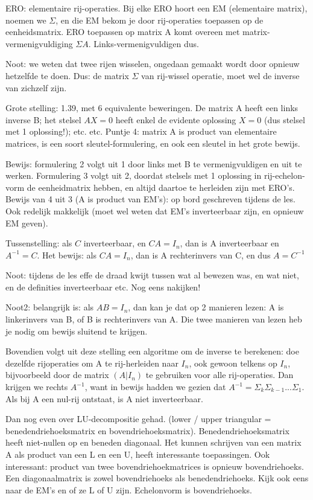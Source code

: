 \documentclass{article}
\begin{document}
ERO: elementaire rij-operaties. Bij elke ERO hoort een EM (elementaire matrix), noemen we $\Sigma$, en die EM bekom je door rij-operaties toepassen op de eenheidsmatrix. ERO toepassen op matrix A komt overeen met matrix-vermenigvuldiging $\Sigma A$. Links-vermenigvuldigen dus. 

Noot: we weten dat twee rijen wisselen, ongedaan gemaakt wordt door opnieuw hetzelfde te doen. Dus: de matrix $\Sigma$ van rij-wissel operatie, moet wel de inverse van zichzelf zijn. 

Grote stelling: 1.39, met 6 equivalente beweringen. De matrix A heeft een links inverse B; het stelsel $AX=0$ heeft enkel de evidente oplossing $X=0$ (dus stelsel met 1 oplossing!); etc. etc. Puntje 4: matrix A is product van elementaire matrices, is een soort sleutel-formulering, en ook een sleutel in het grote bewijs. 

Bewijs: formulering 2 volgt uit 1 door links met B te vermenigvuldigen en uit te werken. Formulering 3 volgt uit 2, doordat stelsels met 1 oplossing in rij-echelon-vorm de eenheidmatrix hebben, en altijd daartoe te herleiden zijn met ERO's. Bewijs van 4 uit 3 (A is product van EM's): op bord geschreven tijdens de les. Ook redelijk makkelijk (moet wel weten dat EM's inverteerbaar zijn, en opnieuw EM geven). 

Tussenstelling: als $C$ inverteerbaar, en $CA=I_n$, dan is A inverteerbaar en $A^{-1}=C$. Het bewijs: als $CA=I_n$, dan is A rechterinvers van C, en dus $A=C^{-1}$

Noot: tijdens de les effe de draad kwijt tussen wat al bewezen was, en wat niet, en de definities inverteerbaar etc. Nog eens nakijken! 

Noot2: belangrijk is: als $AB=I_n$, dan kan je dat op 2 manieren lezen: A is linkerinvers van B, of B is rechterinvers van A. Die twee manieren van lezen heb je nodig om bewijs sluitend te krijgen. 

Bovendien volgt uit deze stelling een algoritme om de inverse te berekenen: doe dezelfde rijoperaties om A te rij-herleiden naar $I_n$, ook gewoon telkens op $I_n$, bijvoorbeeld door de matrix $(A|I_n)$ te gebruiken voor alle rij-operaties. Dan krijgen we rechts $A^{-1}$, want in bewijs hadden we gezien dat $A^{-1} = \Sigma_k \Sigma_{k-1} ... \Sigma_1$. Als bij A een nul-rij ontstaat, is A niet inverteerbaar. 

Dan nog even over LU-decompositie gehad. (lower / upper triangular = benedendriehoeksmatrix en bovendriehoeksmatrix). Benedendriehoeksmatrix heeft niet-nullen op en beneden diagonaal. Het kunnen schrijven van een matrix A als product van een L en een U, heeft interessante toepassingen. Ook interessant: product van twee bovendriehoekmatrices is opnieuw bovendriehoeks. Een diagonaalmatrix is zowel bovendriehoeks als benedendriehoeks. Kijk ook eens naar de EM's en of ze L of U zijn. Echelonvorm is bovendriehoeks. 
\end{document}
